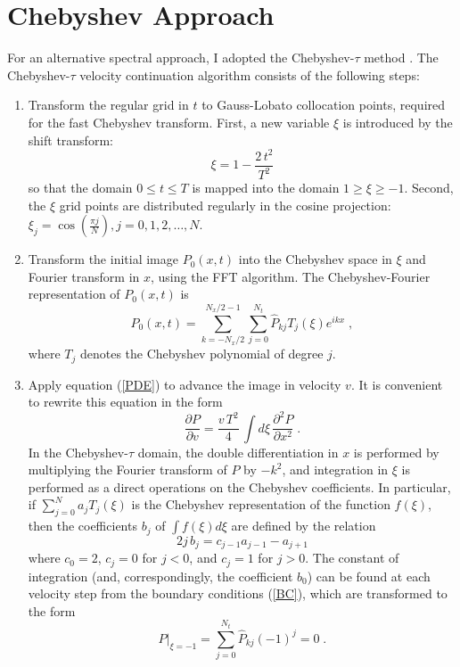 \section{Chebyshev Approach}
For an alternative spectral approach, I adopted the Chebyshev-$\tau$
method \cite[]{lanc,orszag}. The Chebyshev-$\tau$ velocity continuation
algorithm consists of the following steps:
\begin{enumerate}
\item Transform the regular grid in $t$ to Gauss-Lobato collocation
  points, required for the fast Chebyshev transform.  First, a new
  variable $\xi$ is introduced by the shift transform:
  \begin{equation}
    \label{t2x}
    \xi = 1 - \frac{2\,t^2}{T^2}
  \end{equation}
  so that the domain $0 \leq t \leq T$ is mapped into the domain $1
  \geq \xi \geq -1$. Second, the $\xi$ grid points are distributed
  regularly in the cosine projection: $\xi_j = \cos(\frac{\pi j}{N}), j
  = 0,1,2,\ldots,N$.
\item Transform the initial image $P_0 (x,t)$ into the Chebyshev space
  in $\xi$ and Fourier transform in $x$, using the FFT algorithm. The
  Chebyshev-Fourier representation of $P_0 (x,t)$ is
  \begin{equation}
    \label{cheb}
    P_0 (x,t) = \sum_{k=-N_x/2}^{N_x/2-1}\sum_{j=0}^{N_t} 
    \hat{P}_{kj} T_j (\xi) e^{i k x}\;, 
  \end{equation}
 where $T_j$ denotes the Chebyshev polynomial of degree $j$.
\item Apply equation (\ref{PDE}) to advance the image in velocity $v$.
 It is convenient to rewrite this equation in the form
 \begin{equation}
   \frac{\partial P}{\partial v} =  \frac{v\,T^2}{4}\,
   \int d\xi\,\frac{\partial^2 P}{\partial x^2}\;.
   \label{chebPDE} 
 \end{equation}
  In the Chebyshev-$\tau$ domain, the double differentiation in $x$ is
  performed by multiplying the Fourier transform of $P$ by $-k^2$, and
  integration in $\xi$ is performed
  as a direct operations on the Chebyshev coefficients. In
  particular, if $\sum_{j=0}^{N} a_j T_j (\xi)$ is the Chebyshev
  representation of the function $f (\xi)$, then the coefficients
  $b_j$ of $\int f (\xi) d\xi$ are defined by the relation
  \begin{equation}
    \label{int}
    2 j\,b_j = c_{j-1} a_{j-1} - a_{j+1}
  \end{equation}
  where $c_0 = 2$, $c_j = 0$ for $j < 0$, and $c_j = 1$ for $j > 0$.
  The constant of integration (and, correspondingly, the coefficient
  $b_0$) can be found at each velocity step from the boundary
  conditions (\ref{BC}), which are transformed to the form
  \begin{equation}
    \label{chebBC}
    \left.P\right|_{\xi=-1} = \sum_{j=0}^{N_t} \hat{P}_{kj} (-1)^j = 0\;.
  \end{equation}
  

\end{enumerate}
